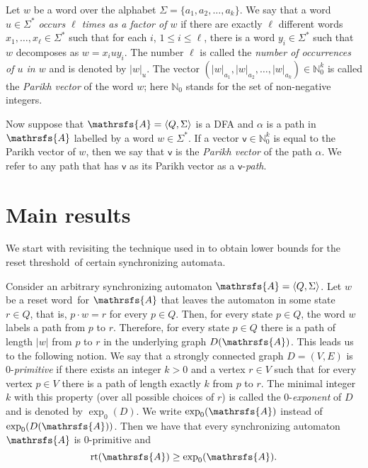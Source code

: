 \documentclass[11pt]{llncs}
\newcommand{\sa}{synchronizing automata}
\newcommand{\sw}{reset word}
\newcommand{\reth}{reset threshold}
\DeclareMathOperator{\rt}{rt}
\begin{document}
Let $w$ be a word over the alphabet $\Sigma = \{a_1, a_2, \ldots, a_k\}$. We
say that a word $u\in\Sigma^*$ \emph{occurs $\ell$ times as a factor of $w$} if
there are exactly $\ell$ different words $x_1, \ldots, x_\ell \in \Sigma^*$
such that for each $i$, $1 \leq i \leq \ell$, there is a word $y_i \in
\Sigma^*$ such that $w$ decomposes as $w = x_iuy_i$. The number $\ell$ is
called the \emph{number of occurrences of $u$ in $w$} and is denoted by
$|w|_u$. The vector $(|w|_{a_1}, |w|_{a_2}, \ldots,
|w|_{a_k})\in\mathbb{N}^k_0$ is called the \emph{Parikh vector} of the word
$w$; here $\mathbb{N}_0$ stands for the set of non-negative integers.

Now suppose that $\mathrsfs{A}=\langle Q,\Sigma\rangle$ is a DFA and $\alpha$
is a path in $\mathrsfs{A}$ labelled by a word $w\in\Sigma^*$. If a vector
$\mathsf{v}\in\mathbb{N}^k_0$ is equal to the Parikh vector of $w$, then we say
that $\mathsf{v}$ is the \emph{Parikh vector} of the path $\alpha$. We refer to
any path that has $\mathsf{v}$ as its Parikh vector as a
$\mathsf{v}$-\emph{path}.

\section{Main results}
\label{sea}

We start with revisiting the technique used in \cite{AGV} to obtain lower
bounds for the \reth\ of certain \sa.

Consider an arbitrary synchronizing automaton $\mathrsfs{A} = \langle Q, \Sigma
\rangle$. Let $w$ be a \sw\ for $\mathrsfs{A}$ that leaves the automaton in
some state $r \in Q$, that is, $p\cdot w=r$ for every $p\in Q$. Then, for every
state $p \in Q$, the word $w$ labels a path from $p$ to $r$. Therefore, for
every state $p \in Q$ there is a path of length $|w|$ from $p$ to $r$ in the
underlying graph $D(\mathrsfs{A})$. This leads us to the following notion. We
say that a strongly connected graph $D=(V,E)$ is 0-\emph{primitive} if there
exists an integer $k > 0$ and a vertex $r \in V$ such that for every vertex
$p\in V$ there is a path of length exactly $k$ from $p$ to $r$. The minimal
integer $k$ with this property (over all possible choices of $r$) is called the
0-\emph{exponent} of $D$ and is denoted by $\exp_0(D)$. We write
$\exp_0(\mathrsfs{A})$ instead of $\exp_0(D(\mathrsfs{A}))$. Then we have that
every synchronizing automaton $\mathrsfs{A}$ is 0-primitive and
\begin{equation}
\label{first inequality} \rt(\mathrsfs{A})\geq \exp_0(\mathrsfs{A}).
\end{equation}
\end{document}
